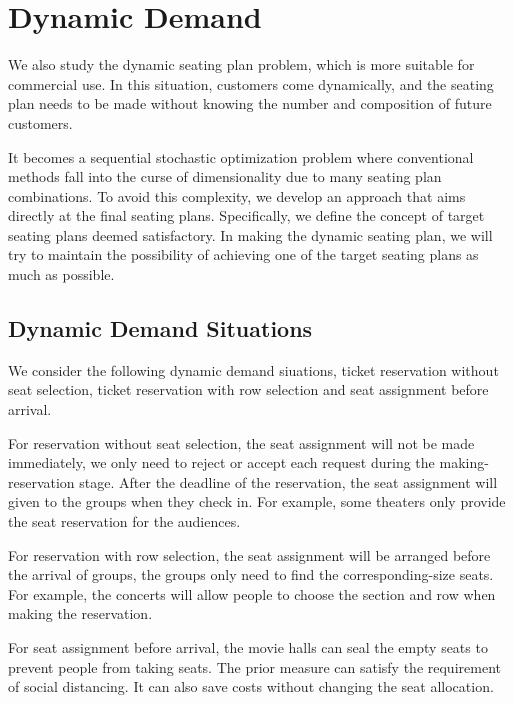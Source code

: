 \section{Dynamic Demand}\label{dynamic_demand}

We also study the dynamic seating plan problem, which is more suitable for commercial use. In this situation, customers come dynamically, and the seating plan needs to be made without knowing the number and composition of future customers. 

It becomes a sequential stochastic optimization problem where conventional methods fall into the curse of dimensionality due to many seating plan combinations. To avoid this complexity, we develop an approach that aims directly at the final seating plans. Specifically, we define the concept of target seating plans deemed satisfactory. In making the dynamic seating plan, we will try to maintain the possibility of achieving one of the target seating plans as much as possible.

\subsection{Dynamic Demand Situations}
We consider the following dynamic demand siuations, ticket reservation without seat selection, ticket reservation with row selection and seat assignment before arrival.

For reservation without seat selection, the seat assignment will not be made immediately, we only need to reject or accept each request during the making-reservation stage. After the deadline of the reservation, the seat assignment will given to the groups when they check in. For example, some theaters only provide the seat reservation for the audiences.

For reservation with row selection, the seat assignment will be arranged before the arrival of groups, the groups only need to find the corresponding-size seats. For example, the concerts will allow people to choose the section and row when making the reservation.

For seat assignment before arrival, the movie halls can seal the empty seats to prevent people from taking seats. The prior measure can satisfy the requirement of social distancing. It can also save costs without changing the seat allocation.


